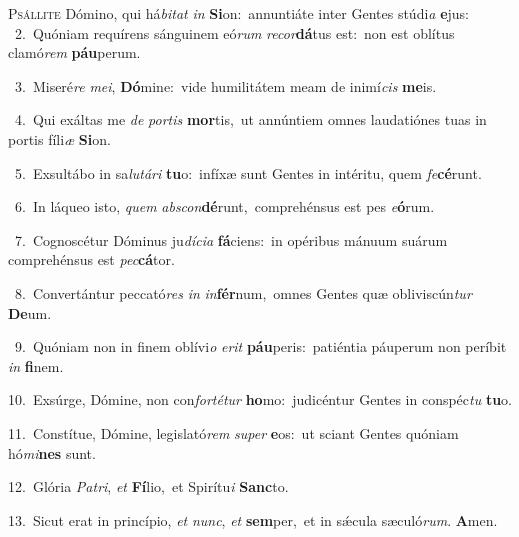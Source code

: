 \lettrine{\initial\textcolor{\initialcolor}{P}}{sállite} Dómino, qui há\-\textit{bi}\-\textit{tat} \textit{in} \textbf{Si}\-on:~\star annuntiáte inter Gentes stúdi\textit{a} \textbf{e}\-jus:\\
{\numbfont\textcolor{\numbcolor}{~2.}}~Quóniam requírens sánguinem eó\textit{rum} \textit{re}\-\textit{cor}\textbf{dá}tus est:~\star non est oblítus clamó\textit{rem} \textbf{páu}\-perum.\par
{\numbfont\textcolor{\numbcolor}{~3.}}~Miseré\textit{re} \textit{me}\-\textit{i}, \textbf{Dó}\-mine:~\star vide humilitátem meam de inimí\textit{cis} \textbf{me}\-is.\par
{\numbfont\textcolor{\numbcolor}{~4.}}~Qui exáltas me \textit{de} \textit{por}\-\textit{tis} \textbf{mor}\-tis,~\star ut annúntiem omnes laudatiónes tuas in portis fíli\textit{æ} \textbf{Si}\-on.\par
{\numbfont\textcolor{\numbcolor}{~5.}}~Exsultábo in sa\-\textit{lu}\-\textit{tá}\textit{ri} \textbf{tu}\-o:~\star infíxæ sunt Gentes in intéritu, quem \textit{fe}\-\textbf{cé}runt.\par
{\numbfont\textcolor{\numbcolor}{~6.}}~In láqueo isto, \textit{quem} \textit{abs}\-\textit{con}\textbf{dé}runt,~\star comprehénsus est pes \textit{e}\-\textbf{ó}rum.\par
{\numbfont\textcolor{\numbcolor}{~7.}}~Cognoscétur Dóminus ju\-\textit{dí}\-\textit{ci}\textit{a} \textbf{fá}\-ciens:~\star in opéribus mánuum suárum comprehénsus est \textit{pec}\-\textbf{cá}tor.\par
{\numbfont\textcolor{\numbcolor}{~8.}}~Convertántur peccató\textit{res} \textit{in} \textit{in}\-\textbf{fér}num,~\star omnes Gentes quæ obliviscún\textit{tur} \textbf{De}\-um.\par
{\numbfont\textcolor{\numbcolor}{~9.}}~Quóniam non in finem oblívi\textit{o} \textit{e}\-\textit{rit} \textbf{páu}\-peris:~\star patiéntia páuperum non períbit \textit{in} \textbf{fi}\-nem.\par
{\numbfont\textcolor{\numbcolor}{10.}}~Exsúrge, Dómine, non con\-\textit{for}\-\textit{té}\textit{tur} \textbf{ho}\-mo:~\star judicéntur Gentes in conspéc\textit{tu} \textbf{tu}\-o.\par
{\numbfont\textcolor{\numbcolor}{11.}}~Constítue, Dómine, legislató\textit{rem} \textit{su}\-\textit{per} \textbf{e}\-os:~\star ut sciant Gentes quóniam hó\-\textit{mi}\-\textbf{nes} sunt.\par
{\numbfont\textcolor{\numbcolor}{12.}}~Glória \textit{Pa}\-\textit{tri}, \textit{et} \textbf{Fí}\-lio,~\star et Spirítu\textit{i} \textbf{Sanc}\-to.\par
{\numbfont\textcolor{\numbcolor}{13.}}~Sicut erat in princípio, \textit{et} \textit{nunc}\-, \textit{et} \textbf{sem}\-per,~\star et in sǽcula sæculó\-\textit{rum}\-. \textbf{A}\-men.\par

